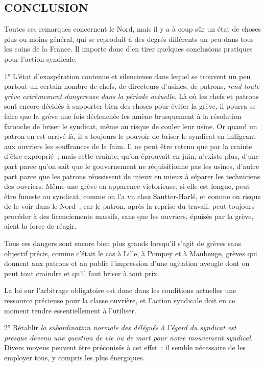 \documentclass[french,twoside]{book} %
\begin{document}
\subsection[CONCLUSION]{CONCLUSION}
\noindent Toutes ces remarques concernent le Nord, mais il y a à coup sûr un état de choses plus ou moins général, qui se reproduit à des degrés différents un peu dans tous les coins de la France. Il importe donc d'en tirer quelques conclusions pratiques pour l'action syndicale.\par
1° L'état d'exaspération contenue et silencieuse dans lequel se trouvent un peu partout un certain nombre de chefs, de directeurs d'usines, de patrons, {\itshape rend toute grève extrêmement dangereuse dans la période actuelle}. Là où les chefs et patrons sont encore décidés à supporter bien des choses pour éviter la grève, il pourra se faire que la grève une fois déclenchée les amène brusquement à la résolution farouche de briser le syndicat, même au risque de couler leur usine. Or quand un patron en est arrivé là, il a toujours le pouvoir de briser le syndicat en infligeant aux ouvriers les souffrances de la faim. Il ne peut être retenu que par la crainte d'être exproprié ; mais cette crainte, qu'on éprouvait en juin, n'existe plus, d'une part parce qu'on sait que le gouvernement ne réquisitionne pas les usines, d'autre part parce que les patrons réussissent de mieux en mieux à séparer les techniciens des ouvriers. Même une grève en apparence victorieuse, si elle est longue, peut être funeste au syndicat, comme on l'a vu chez Sautter-Harlé, et comme on risque de le voir dans le Nord ; car le patron, après la reprise du travail, peut toujours procéder à des licenciements massifs, sans que les ouvriers, épuisés par la grève, aient la force de réagir.\par
Tous ces dangers sont encore bien plus grands lorsqu'il s'agit de grèves sans objectif précis, comme c'était le cas à Lille, à Pompey et à Maubeuge, grèves qui donnent aux patrons et au public l'impression d'une agitation aveugle dont on peut tout craindre et qu'il faut briser à tout prix.\par
La loi sur l'arbitrage obligatoire est donc dans les conditions actuelles une ressource précieuse pour la classe ouvrière, et l'action syndicale doit en ce moment tendre essentiellement à l'utiliser.\par
2° Rétablir {\itshape la subordination normale des délégués à l'égard du syndicat est presque devenu une question de vie ou de mort pour notre mouvement syndical}. Divers moyens peuvent être préconisés à cet effet ; il semble nécessaire de les employer tous, y compris les plus énergiques.\par
\end{document}
